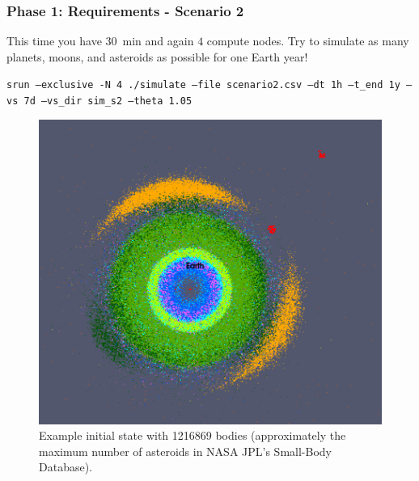 \begin{frame}[fragile]
  \frametitle{Phase 1: Requirements - Scenario 2}
  This time you have \SI{30}{\minute} and again $4$ compute nodes. Try to simulate as many planets, moons, and asteroids as possible for one Earth year!
  \begin{center}
    \setfontsize{6.8pt}
    \texttt{srun --exclusive -N 4 ./simulate --file scenario2.csv --dt 1h --t_end 1y --vs 7d --vs_dir sim_s2 --theta 1.05} \\[.75em]

    \begin{figure}
        \includegraphics[width=.3\textwidth]{figures/all_bodies_inner_system}
        \caption{Example initial state with \num{1216869} bodies (approximately the maximum number of asteroids in NASA JPL's Small-Body Database).}
    \end{figure}
  \end{center}
\end{frame}

